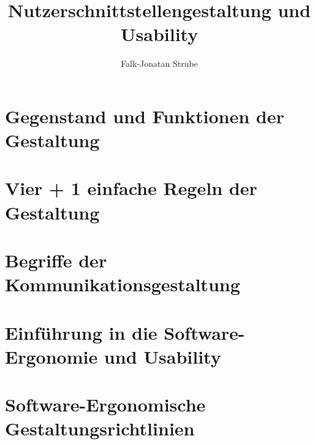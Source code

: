 \documentclass{scrreprt}
\title{Nutzerschnittstellen\-gestaltung und Usability}
\author{Falk-Jonatan Strube}
\begin{document}
\maketitle
\tableofcontents

\chapter{Gegenstand und Funktionen der Gestaltung}


\chapter{Vier + 1 einfache Regeln der Gestaltung}


\chapter{Begriffe der Kommunikationsgestaltung}


\chapter{Einführung in die Software-Ergonomie und Usability}


\chapter{Software-Ergonomische Gestaltungsrichtlinien}

\end{document}
